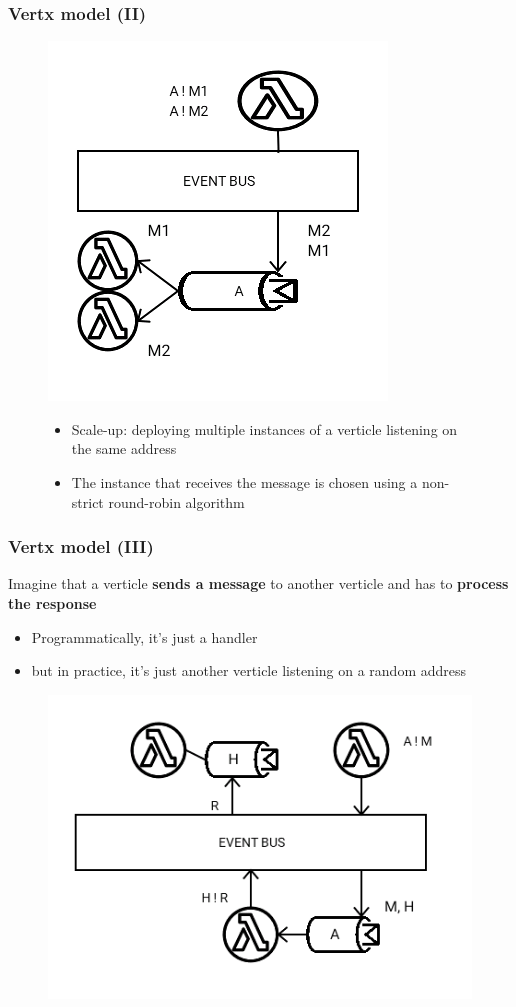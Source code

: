 \documentclass{beamer}
\begin{document}
\begin{frame}
\frametitle{Vertx model (II)}
\begin{figure}
\includegraphics[scale=0.3]{images/vertx-model-2.png}
\begin{itemize}
\item<1-> Scale-up: deploying multiple instances of a verticle listening on the same address
\item<2-> The instance that receives the message is chosen using a non-strict round-robin algorithm 
\end{itemize}
\end{figure}
\end{frame}

\begin{frame}
\frametitle{Vertx model (III)}
Imagine that a verticle \textbf{sends a message} to another verticle and has to\textbf{ process the response}
\begin{itemize}
\item<1-> Programmatically, it's just a handler
\item<2-> but in practice, it's just another verticle listening on a random address
\end{itemize}
\begin{figure}
\includegraphics[scale=0.3]{images/vertx-model-3.png}
\end{figure}
\end{frame}
\end{document}
